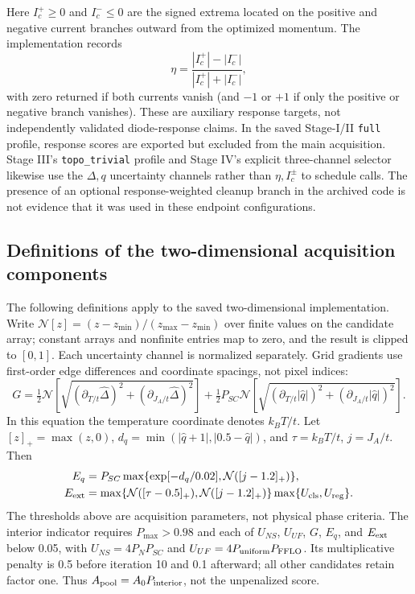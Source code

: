 Here $I_c^+\geq0$ and $I_c^-\leq0$ are the signed extrema located on the positive and negative current branches outward from the optimized momentum. The implementation records
\begin{equation}\eta=\frac{|I_c^+|-|I_c^-|}{|I_c^+|+|I_c^-|},\label{eq:eta}\end{equation}
with zero returned if both currents vanish (and $-1$ or $+1$ if only the positive or negative branch vanishes). These are auxiliary response targets, not independently validated diode-response claims. In the saved Stage-I/II \texttt{full} profile, response scores are exported but excluded from the main acquisition. Stage III's \texttt{topo\_trivial} profile and Stage IV's explicit three-channel selector likewise use the $\Delta,q$ uncertainty channels rather than $\eta,I_c^\pm$ to schedule calls. The presence of an optional response-weighted cleanup branch in the archived code is not evidence that it was used in these endpoint configurations.

\subsection{Definitions of the two-dimensional acquisition components}\label{sec:acq-definitions}
The following definitions apply to the saved two-dimensional implementation. Write $\mathcal N[z]=(z-z_{\min})/(z_{\max}-z_{\min})$ over finite values on the candidate array; constant arrays and nonfinite entries map to zero, and the result is clipped to $[0,1]$. Each uncertainty channel is normalized separately. Grid gradients use first-order edge differences and coordinate spacings, not pixel indices:
\begin{equation}
G=\tfrac12\mathcal N\!\left[\sqrt{(\partial_{T/t}\hat\Delta)^2+(\partial_{J_A/t}\hat\Delta)^2}\right]
+\tfrac12 P_{SC}\mathcal N\!\left[\sqrt{(\partial_{T/t}|\hat q|)^2+(\partial_{J_A/t}|\hat q|)^2}\right].\label{eq:gradient}
\end{equation}
In this equation the temperature coordinate denotes $k_BT/t$. Let $[z]_+=\max(z,0)$, $d_q=\min(|\hat q+1|,|0.5-\hat q|)$, and $\tau=k_BT/t$, $j=J_A/t$. Then
\begin{align}
E_q&=P_{SC}\max\{\exp[-d_q/0.02],\mathcal N([j-1.2]_+)\},\label{eq:eq-risk}\\
E_{\rm ext}&=\max\{\mathcal N([\tau-0.5]_+),\mathcal N([j-1.2]_+)\}\max\{U_{\rm cls},U_{\rm reg}\}.\label{eq:extrapolation}
\end{align}
The thresholds above are acquisition parameters, not physical phase criteria. The interior indicator requires $P_{\max}>0.98$ and each of $U_{NS}$, $U_{UF}$, $G$, $E_q$, and $E_{\rm ext}$ below 0.05, with $U_{NS}=4P_NP_{SC}$ and $U_{UF}=4P_{\rm uniform}P_{\rm FFLO}$. Its multiplicative penalty is 0.5 before iteration 10 and 0.1 afterward; all other candidates retain factor one. Thus $A_{\rm pool}=A_0P_{\rm interior}$, not the unpenalized score.

